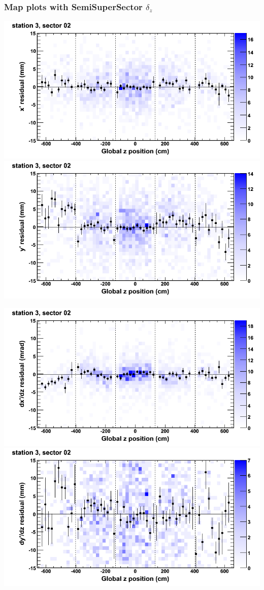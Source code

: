 \documentclass[compress]{beamer}
\begin{document}
\begin{frame}
\frametitle{Map plots with SemiSuperSector $\delta_z$}
\includegraphics[width=0.5\linewidth]{zfit_mapplots/DTvsz_st3sec02_x.png}
\includegraphics[width=0.5\linewidth]{zfit_mapplots/DTvsz_st3sec02_y.png}

\includegraphics[width=0.5\linewidth]{zfit_mapplots/DTvsz_st3sec02_dxdz.png}
\includegraphics[width=0.5\linewidth]{zfit_mapplots/DTvsz_st3sec02_dydz.png}
\end{frame}
\end{document}
